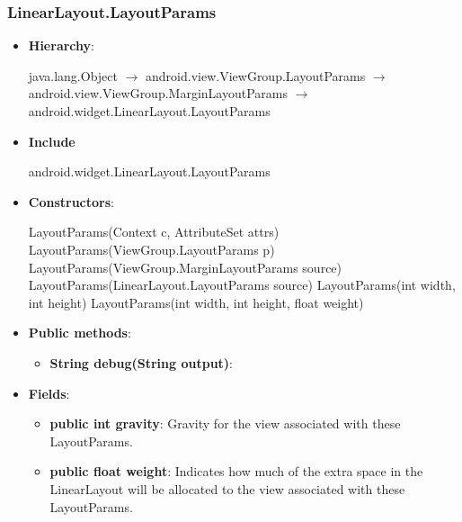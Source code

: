 \documentclass{report}
\begin{document}
\begin{itemize}
    \end{itemize}

    \pagebreak 
    \subsubsection{LinearLayout.LayoutParams}
    \begin{itemize}
        \item \textbf{Hierarchy}:
            \begin{center}
                java.lang.Object $\to $	android.view.ViewGroup.LayoutParams $\to $	android.view.ViewGroup.MarginLayoutParams $\to $	android.widget.LinearLayout.LayoutParams
            \end{center}
        \item \textbf{Include}
            \bigbreak \noindent 
            \begin{javacode}
                android.widget.LinearLayout.LayoutParams
            \end{javacode}
        \item \textbf{Constructors}:
            \bigbreak \noindent 
            \begin{javacode}
                LayoutParams(Context c, AttributeSet attrs)
                LayoutParams(ViewGroup.LayoutParams p)
                LayoutParams(ViewGroup.MarginLayoutParams source)
                LayoutParams(LinearLayout.LayoutParams source)
                LayoutParams(int width, int height)
                LayoutParams(int width, int height, float weight)
            \end{javacode}
        \item \textbf{Public methods}:
            \begin{itemize}
                \item \textbf{String	debug(String output)}:
            \end{itemize}
        \item \textbf{Fields}:
            \begin{itemize}
                \item \textbf{public int	gravity}: Gravity for the view associated with these LayoutParams.
                \item \textbf{public float	weight}: Indicates how much of the extra space in the LinearLayout will be allocated to the view associated with these LayoutParams.
            \end{itemize}
    \end{itemize}
\end{document}
